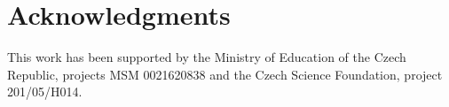 \documentclass[12pt,a4paper, fleqn, leqno, twoside]{article}
\begin{document}
% 
% 
% 
% 
% 
% 
% 


\section*{Acknowledgments}
This work has been supported by the Ministry of Education of the Czech Republic, projects MSM 0021620838 and the Czech Science Foundation, project  201/05/H014.






\end{document}
